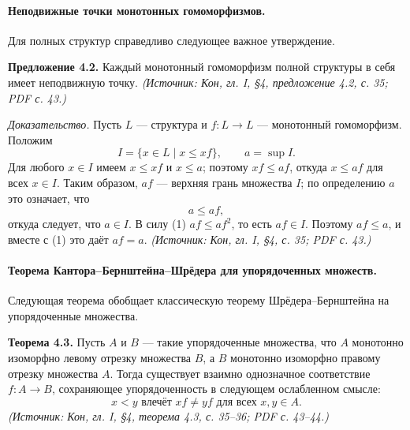 \documentclass[a4paper,12pt]{article}
\begin{document}
\paragraph{Неподвижные точки монотонных гомоморфизмов.}
Для полных структур справедливо следующее важное утверждение.

\textbf{Предложение 4.2.} Каждый монотонный гомоморфизм полной структуры в себя имеет неподвижную точку.
\textit{(Источник: Кон, гл. I, §4, предложение 4.2, с. 35; PDF с. 43.)}

\emph{Доказательство.} Пусть \(L\) — структура и \(f\colon L\to L\) — монотонный гомоморфизм. Положим
\[
I=\{x\in L\mid x\le xf\},\qquad a=\sup I.
\]
Для любого \(x\in I\) имеем \(x\le xf\) и \(x\le a\); поэтому \(xf\le af\), откуда \(x\le af\) для всех \(x\in I\). Таким образом, \(af\) — верхняя грань множества \(I\); по определению \(a\) это означает, что
\[
a\le af,
\]
откуда следует, что \(a\in I\). В силу (1) \(af\le af^2\), то есть \(af\in I\). Поэтому \(af\le a\), и вместе с (1) это даёт \(af=a\).
\textit{(Источник: Кон, гл. I, §4, с. 35; PDF с. 43.)}

\paragraph{Теорема Кантора--Бернштейна--Шрёдера для упорядоченных множеств.}
Следующая теорема обобщает классическую теорему Шрёдера--Бернштейна на упорядоченные множества.

\textbf{Теорема 4.3.} Пусть \(A\) и \(B\) — такие упорядоченные множества, что \(A\) монотонно изоморфно левому отрезку множества \(B\), а \(B\) монотонно изоморфно правому отрезку множества \(A\). Тогда существует взаимно однозначное соответствие \(f\colon A\to B\), сохраняющее упорядоченность в следующем ослабленном смысле:
\[
x<y\text{ влечёт }xf\ne yf\text{ для всех }x,y\in A.
\]
\textit{(Источник: Кон, гл. I, §4, теорема 4.3, с. 35--36; PDF с. 43--44.)}
\end{document}
